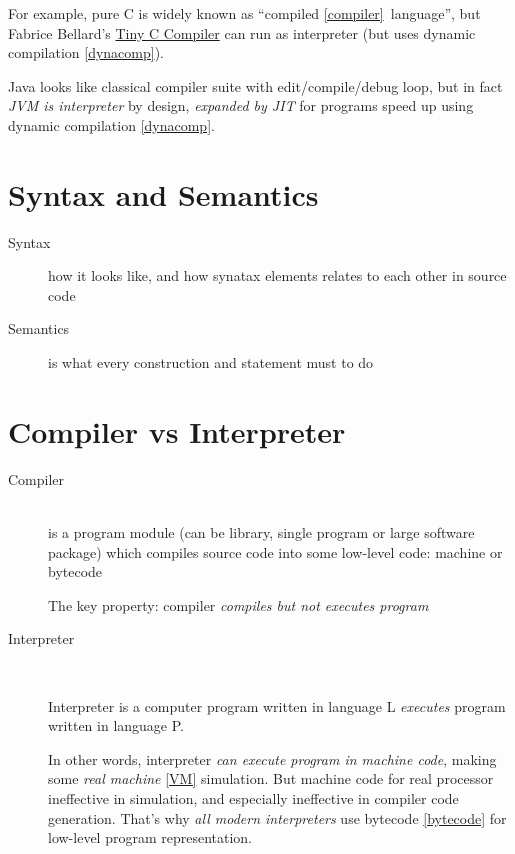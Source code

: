 For example, pure C is widely known as ``compiled \ref{compiler}\ language'',
but Fabrice Bellard's \href{http://bellard.org/tcc/}{Tiny C Compiler} can run
as interpreter (but uses dynamic compilation \ref{dynacomp}).

Java looks like classical compiler suite with edit/compile/debug
loop, but in fact \emph{JVM is interpreter} by design, \emph{expanded by JIT}
for programs speed up using dynamic compilation \ref{dynacomp}.

\section{Syntax and Semantics}

\begin{description}
\item[Syntax]\label{syntax} how it looks like, and how synatax elements relates
to each other in source code
\item[Semantics]\label{semantics} is what every construction and statement must
to do
\end{description}


\section{Compiler vs Interpreter}

\begin{description}
\item[Compiler]\ \\
is a program module (can be library, single program or large
software package) which compiles source code into some low-level code: machine
or bytecode

\setlength{\topsep}{0pt}
\begin{framed}
The key property: compiler \emph{compiles but not executes program}
\end{framed}
\item[Interpreter]\label{interpreter}\ \\
\begin{framed}
Interpreter is a computer program written in language L \emph{executes} program
written in language P.
\end{framed}

In other words, interpreter \emph{can execute program in machine code}, making
some \emph{real machine} \ref{VM} simulation. 
But machine code for real
processor ineffective in simulation, and especially ineffective in compiler code generation. That's why
\emph{all modern interpreters} use bytecode \ref{bytecode} for low-level program
representation.
\end{description}

